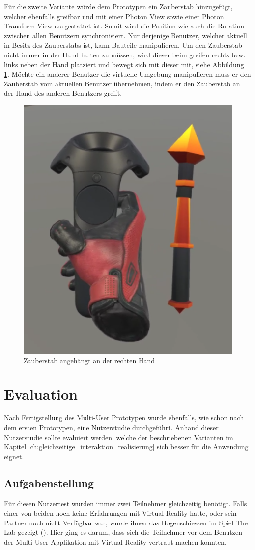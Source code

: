 Für die zweite Variante würde dem Prototypen ein Zauberstab hinzugefügt, welcher ebenfalls greifbar und mit einer Photon View sowie einer Photon Transform View ausgestattet ist. Somit wird die Position wie auch die Rotation zwischen allen Benutzern synchronisiert. Nur derjenige Benutzer, welcher aktuell in Besitz des Zauberstabs ist, kann Bauteile manipulieren. Um den Zauberstab nicht immer in der Hand halten zu müssen, wird dieser beim greifen rechts bzw. links neben der Hand platziert und bewegt sich mit dieser mit, siehe Abbildung \ref{fig:magic_wand}. Möchte ein anderer Benutzer die virtuelle Umgebung manipulieren muss er den Zauberstab vom aktuellen Benutzer übernehmen, indem er den Zauberstab an der Hand des anderen Benutzers greift.

\begin{figure}[h!]
	\centering
	\includegraphics[keepaspectratio,width=0.25\linewidth]{img/MagicWand.PNG}
	\caption{Zauberstab angehängt an der rechten Hand}
	\label{fig:magic_wand}
\end{figure} 

\section{Evaluation}
Nach Fertigstellung des Multi-User Prototypen wurde ebenfalls, wie schon nach dem ersten Prototypen, eine Nutzerstudie durchgeführt. Anhand dieser Nutzerstudie sollte evaluiert werden, welche der beschriebenen Varianten im Kapitel \ref{ch:gleichzeitige_interaktion_realisierung} sich besser für die Anwendung eignet.

\subsection{Aufgabenstellung}
Für diesen Nutzertest wurden immer zwei Teilnehmer gleichzeitig benötigt. Falls einer von beiden noch keine Erfahrungen mit Virtual Reality hatte, oder sein Partner noch nicht Verfügbar war, wurde ihnen das Bogenschiessen im Spiel \grqq The Lab\grqq{} gezeigt (\cite{noauthor_lab_2019}). Hier ging es darum, dass sich die Teilnehmer vor dem Benutzen der Multi-User Applikation mit Virtual Reality vertraut machen konnten. \\

